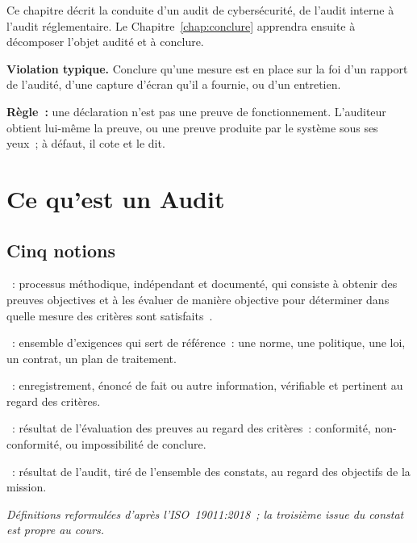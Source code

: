 \medskip

Ce chapitre décrit la conduite d'un audit de cybersécurité, de l'audit
interne à l'audit réglementaire. Le Chapitre~\ref{chap:conclure} apprendra
ensuite à décomposer l'objet audité et à conclure.

\begin{boxalert}
\textbf{Violation typique.} Conclure qu'une mesure est en place sur la
foi d'un rapport de l'audité, d'une capture d'écran qu'il a fournie, ou
d'un entretien.

\smallskip
\textbf{Règle~:} une déclaration n'est pas une preuve de fonctionnement.
L'auditeur obtient lui-même la preuve, ou une preuve produite par le
système sous ses yeux~; à défaut, il cote \NEK{} et le dit.
\end{boxalert}

\separateur

\section{Ce qu'est un Audit}
\label{sec:c06-definir}

\subsection{Cinq notions}

\begin{boxdef}
~: processus méthodique, indépendant et
documenté, qui consiste à obtenir des preuves objectives et à les évaluer
de manière objective pour déterminer dans quelle mesure des critères sont
satisfaits~\cite{iso19011_2018}.

\medskip
{}~: ensemble d'exigences
qui sert de référence~: une norme, une politique, une loi, un contrat, un
plan de traitement.

\medskip
{}~: enregistrement,
énoncé de fait ou autre information, vérifiable et pertinent au regard des
critères.

\medskip
{}~: résultat de
l'évaluation des preuves au regard des critères~: conformité,
non-conformité, ou impossibilité de conclure.

\medskip
{}~: résultat de
l'audit, tiré de l'ensemble des constats, au regard des objectifs de la
mission.
\end{boxdef}
{\small\itshape Définitions reformulées d'après l'ISO~19011:2018~; la
troisième issue du constat est propre au cours.}

